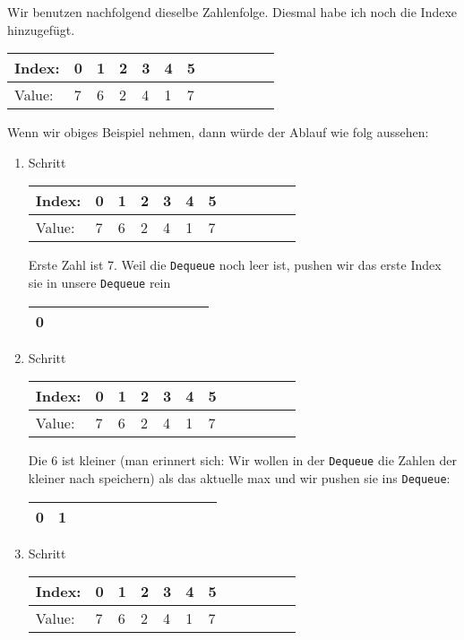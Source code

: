 \documentclass{book}
\begin{document}
Wir benutzen nachfolgend dieselbe Zahlenfolge. Diesmal habe ich noch die Indexe hinzugefügt.

	\begin{tabular}{|l|l|l|l|l|l|l|l|l|l|l|l|} 
		\hline
		Index: & 0 & 1 & 2 & 3 & 4 & 5\\ 
		\hline
		Value: & 7 & 6 & 2 & 4 & 1 & 7\\
		\hline
	\end{tabular}


Wenn wir obiges Beispiel nehmen, dann würde der Ablauf wie folg aussehen:
\begin{enumerate} 
	\item Schritt
	
	\begin{tabular}{|l|l|l|l|l|l|l|l|l|l|l|l|} 
		\hline
		Index: & \cellcolor{yellow!25}0 & 1 & 2 & 3 & 4 & 5\\ 
		\hline
		Value: & \cellcolor{blue!25}7 & 6 & 2 & 4 & 1 & 7\\
		\hline
	\end{tabular}
		
	Erste Zahl ist 7. Weil die \lstinline|Dequeue| noch leer ist, pushen wir das erste Index sie in unsere \lstinline|Dequeue| rein	\begin{tabular}{|l|l|l|l|l|l|l|l|l|l|l|l|} 
		\hline
		0 \\
		\hline
	\end{tabular} 
	\item Schritt
	
	\begin{tabular}{|l|l|l|l|l|l|l|l|l|l|l|l|} 
		\hline
		Index: & \cellcolor{yellow!25}0 & \cellcolor{yellow!25}1 & 2 & 3 & 4 & 5\\ 
		\hline
		Value: & \cellcolor{blue!25}7 & \cellcolor{blue!25}6 & 2 & 4 & 1 & 7\\
		\hline
	\end{tabular}
		
	Die 6 ist kleiner (man erinnert sich: Wir wollen in der \lstinline|Dequeue| die Zahlen der kleiner nach speichern) als das aktuelle max und wir pushen sie ins \lstinline|Dequeue|: 	\begin{tabular}{|l|l|l|l|l|l|l|l|l|l|l|l|} 
		\hline
		0 & 1 \\
		\hline
	\end{tabular} 
	
	\item Schritt
	
	\begin{tabular}{|l|l|l|l|l|l|l|l|l|l|l|l|} 
		\hline
		Index: & \cellcolor{yellow!25}0 & \cellcolor{yellow!25}1 & \cellcolor{yellow!25}2 & 3 & 4 & 5\\ 
		\hline
		Value: & \cellcolor{blue!25}7 & \cellcolor{blue!25}6 & \cellcolor{blue!25}2 & 4 & 1 & 7\\
		\hline
	\end{tabular}
	

\end{enumerate}
\end{document}

